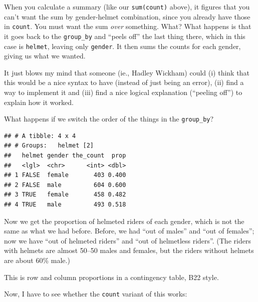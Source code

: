 \documentclass[]{tufte-book}
\newenvironment{Shaded}{}{}
\newcommand{\DataTypeTok}[1]{\textcolor[rgb]{0.56,0.13,0.00}{#1}}
\newcommand{\KeywordTok}[1]{\textcolor[rgb]{0.00,0.44,0.13}{\textbf{#1}}}
\newcommand{\NormalTok}[1]{#1}
\newcommand{\OperatorTok}[1]{\textcolor[rgb]{0.40,0.40,0.40}{#1}}
\newcommand{\StringTok}[1]{\textcolor[rgb]{0.25,0.44,0.63}{#1}}
\theoremstyle{definition}
\theoremstyle{definition}
\theoremstyle{definition}
\theoremstyle{remark}
\begin{document}
When you calculate a summary (like our \texttt{sum(count)} above), it
figures that you can't want the sum by gender-helmet combination, since
you already have those in \texttt{count}. You must want the sum
\emph{over} something. What? What happens is that it goes back to the
\texttt{group\_by} and ``peels off'' the last thing there, which in this
case is \texttt{helmet}, leaving only \texttt{gender}. It then sums the
counts for each gender, giving us what we wanted.

It just blows my mind that someone (ie., Hadley Wickham) could (i) think
that this would be a nice syntax to have (instead of just being an
error), (ii) find a way to implement it and (iii) find a nice logical
explanation (``peeling off'') to explain how it worked.

What happens if we switch the order of the things in the
\texttt{group\_by}?

\begin{Shaded}
\end{Shaded}

\begin{verbatim}
## # A tibble: 4 x 4
## # Groups:   helmet [2]
##   helmet gender the_count  prop
##   <lgl>  <chr>      <int> <dbl>
## 1 FALSE  female       403 0.400
## 2 FALSE  male         604 0.600
## 3 TRUE   female       458 0.482
## 4 TRUE   male         493 0.518
\end{verbatim}

Now we get the proportion of helmeted riders of each gender, which is
not the same as what we had before. Before, we had ``out of males'' and
``out of females''; now we have ``out of helmeted riders'' and ``out of
helmetless riders''. (The riders with helmets are almost 50--50 males
and females, but the riders without helmets are about 60\% male.)

This is row and column proportions in a contingency table, B22 style.

Now, I have to see whether the \texttt{count} variant of this works:
\end{document}
